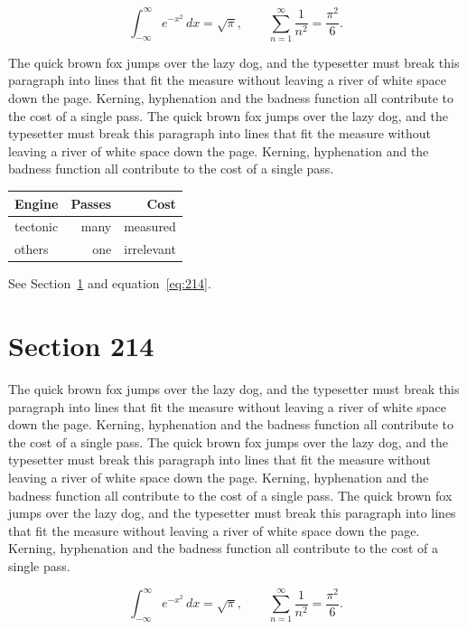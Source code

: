\documentclass{article}
\begin{document}
\begin{equation}\label{eq:213}
\int_{-\infty}^{\infty} e^{-x^{2}}\,dx = \sqrt{\pi}, \qquad
\sum_{n=1}^{\infty} \frac{1}{n^{2}} = \frac{\pi^{2}}{6}.
\end{equation}

The quick brown fox jumps over the lazy dog, and the typesetter must break this paragraph into lines that fit the measure without leaving a river of white space down the page. Kerning, hyphenation and the badness function all contribute to the cost of a single pass. The quick brown fox jumps over the lazy dog, and the typesetter must break this paragraph into lines that fit the measure without leaving a river of white space down the page. Kerning, hyphenation and the badness function all contribute to the cost of a single pass. 

\begin{center}
\begin{tabular}{lrr}
\toprule
Engine & Passes & Cost \\
\midrule
tectonic & many & measured \\
others & one & irrelevant \\
\bottomrule
\end{tabular}
\end{center}

See Section~\ref{sec:214} and equation~\eqref{eq:214}.
\section{Section 214}
\label{sec:214}
The quick brown fox jumps over the lazy dog, and the typesetter must break this paragraph into lines that fit the measure without leaving a river of white space down the page. Kerning, hyphenation and the badness function all contribute to the cost of a single pass. The quick brown fox jumps over the lazy dog, and the typesetter must break this paragraph into lines that fit the measure without leaving a river of white space down the page. Kerning, hyphenation and the badness function all contribute to the cost of a single pass. The quick brown fox jumps over the lazy dog, and the typesetter must break this paragraph into lines that fit the measure without leaving a river of white space down the page. Kerning, hyphenation and the badness function all contribute to the cost of a single pass. 

\begin{equation}\label{eq:214}
\int_{-\infty}^{\infty} e^{-x^{2}}\,dx = \sqrt{\pi}, \qquad
\sum_{n=1}^{\infty} \frac{1}{n^{2}} = \frac{\pi^{2}}{6}.
\end{equation}
\end{document}
